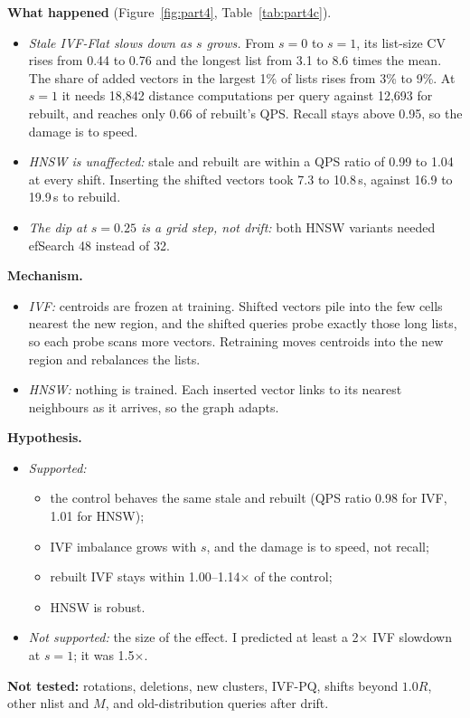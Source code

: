\documentclass[10pt,twocolumn]{article}
\begin{document}
\textbf{What happened} (Figure~\ref{fig:part4}, Table~\ref{tab:part4c}).
\begin{itemize}
\item \emph{Stale IVF-Flat slows down as $s$ grows.} From $s=0$ to $s=1$, its list-size CV rises
  from 0.44 to 0.76 and the longest list from 3.1 to 8.6 times the mean. The share of added vectors
  in the largest 1\% of lists rises from 3\% to 9\%. At $s=1$ it needs 18,842 distance
  computations per query against 12,693 for rebuilt, and reaches only 0.66 of rebuilt's QPS.
  Recall stays above 0.95, so the damage is to speed.
\item \emph{HNSW is unaffected:} stale and rebuilt are within a QPS ratio of 0.99 to 1.04 at every
  shift. Inserting the shifted vectors took 7.3 to 10.8\,s, against 16.9 to 19.9\,s to rebuild.
\item \emph{The dip at $s=0.25$ is a grid step, not drift:} both HNSW variants needed efSearch 48
  instead of 32.
\end{itemize}

\textbf{Mechanism.}
\begin{itemize}
\item \emph{IVF:} centroids are frozen at training. Shifted vectors pile into the few cells
  nearest the new region, and the shifted queries probe exactly those long lists, so each probe
  scans more vectors. Retraining moves centroids into the new region and rebalances the lists.
\item \emph{HNSW:} nothing is trained. Each inserted vector links to its nearest neighbours as it
  arrives, so the graph adapts.
\end{itemize}

\textbf{Hypothesis.}
\begin{itemize}
\item \emph{Supported:}
  \begin{itemize}
  \item the control behaves the same stale and rebuilt (QPS ratio 0.98 for IVF, 1.01 for HNSW);
  \item IVF imbalance grows with $s$, and the damage is to speed, not recall;
  \item rebuilt IVF stays within 1.00--1.14$\times$ of the control;
  \item HNSW is robust.
  \end{itemize}
\item \emph{Not supported:} the size of the effect. I predicted at least a 2$\times$ IVF
  slowdown at $s=1$; it was 1.5$\times$.
\end{itemize}
\textbf{Not tested:} rotations, deletions, new clusters, IVF-PQ, shifts beyond $1.0R$, other
nlist and $M$, and old-distribution queries after drift.
\end{document}
